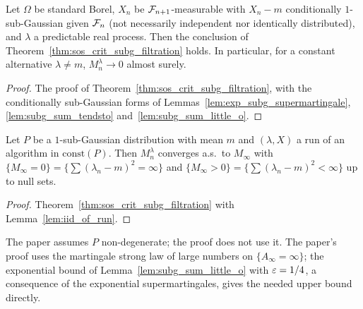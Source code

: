 \begin{theorem}
  \label{thm:sos_crit_subg_cond}
  \leanok
  Let $\Omega$ be standard Borel, $X_n$ be $\mathcal{F}_{n+1}$-measurable with $X_n - m$ conditionally
  $1$-sub-Gaussian given $\mathcal{F}_n$ (not necessarily independent nor identically distributed), and
  $\lambda$ a predictable real process. Then the conclusion of
  Theorem~\ref{thm:sos_crit_subg_filtration} holds. In particular, for a constant alternative
  $\lambda \ne m$, $M^\lambda_n \to 0$ almost surely.
\end{theorem}

\begin{proof}
  \leanok
  The proof of Theorem~\ref{thm:sos_crit_subg_filtration}, with the conditionally sub-Gaussian
  forms of Lemmas~\ref{lem:exp_subg_supermartingale}, \ref{lem:subg_sum_tendsto}
  and~\ref{lem:subg_sum_little_o}.
\end{proof}

\begin{theorem}
  \label{thm:sos_crit_subg}
  \leanok
  Let $P$ be a $1$-sub-Gaussian distribution with mean $m$ and $(\lambda, X)$ a run of an algorithm
  in $\mathrm{const}(P)$. Then $M^\lambda_n$ converges a.s.\ to $M_\infty$ with
  $\{M_\infty = 0\} = \{\sum (\lambda_n - m)^2 = \infty\}$ and
  $\{M_\infty > 0\} = \{\sum (\lambda_n - m)^2 < \infty\}$ up to null sets.
\end{theorem}

\begin{proof}
  \leanok
  Theorem~\ref{thm:sos_crit_subg_filtration} with Lemma~\ref{lem:iid_of_run}.
\end{proof}

\begin{remark}
  The paper assumes $P$ non-degenerate; the proof does not use it. The paper's proof uses the
  martingale strong law of large numbers on $\{A_\infty = \infty\}$; the exponential
  bound of Lemma~\ref{lem:subg_sum_little_o} with $\varepsilon = 1/4$, a consequence of the exponential
  supermartingales, gives the needed upper bound directly.
\end{remark}

